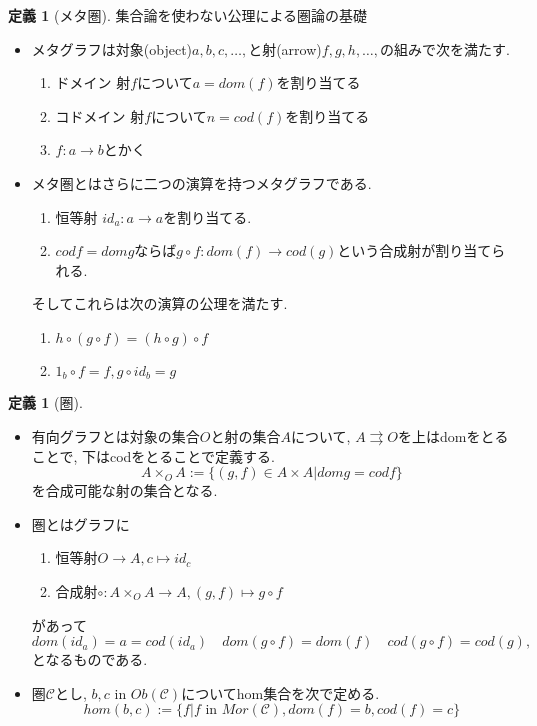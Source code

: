 \documentclass[dvipdfmx,a4paper,11pt]{article}
\theoremstyle{definition}
\newtheorem{dfn}[thm]{定義}
\begin{document}
 \begin{tcolorbox}
 [colback = white, colframe = green!35!black, fonttitle = \bfseries,breakable = true]
\begin{dfn}[メタ圏]
集合論を使わない公理による圏論の基礎
\begin{itemize}
\item メタグラフは対象(object)$a,b,c,\ldots, $と射(arrow)$f,g,h,\ldots, $の組みで次を満たす.
\begin{enumerate}
\item ドメイン 射$f$について$a = dom(f)$を割り当てる
\item コドメイン 射$f$について$n = cod(f)$を割り当てる
\item $f : a \to b$とかく
\end{enumerate}
\item  メタ圏とはさらに二つの演算を持つメタグラフである.
\begin{enumerate}
\item 恒等射 $id_a : a \to a$を割り当てる.
\item $cod f = dom g$ならば$g \circ f : dom(f) \to cod(g)$という合成射が割り当てられる.
\end{enumerate}
そしてこれらは次の演算の公理を満たす.
\begin{enumerate}
\item $h\circ (g \circ f) = (h\circ g) \circ f$
\item $1_{b} \circ f = f, g \circ id_{b} = g$
\end{enumerate}
\end{itemize}
\end{dfn}
\end{tcolorbox}


 \begin{tcolorbox}
 [colback = white, colframe = green!35!black, fonttitle = \bfseries,breakable = true]
\begin{dfn}[圏]
\begin{itemize}
\item 有向グラフとは対象の集合$O$と射の集合$A$について, $A \rightrightarrows O$を上はdomをとることで, 下はcodをとることで定義する.
$$
A \times_{O} A := \{ (g,f) \in A \times A| dom g = cod f
\}
$$
を合成可能な射の集合となる.
\item 圏とはグラフに
\begin{enumerate}
\item 恒等射$O \to A, c \mapsto id_c$
\item 合成射$ \circ : A \times_{O} A \to A, (g,f) \mapsto g \circ f$
\end{enumerate}
があって
$$dom(id_a) = a = cod (id_a) \quad 
dom(g \circ f ) = dom (f) \quad cod (g \circ f ) = cod (g), 
$$
となるものである.
\item 圏$\mathcal{C}$とし, $b,c \text{ in } Ob(\mathcal{C})$についてhom集合を次で定める.
$$
hom(b,c) := \{ f | f \text{ in } Mor(\mathcal{C}), dom (f) = b, cod (f) = c\}
$$
\end{itemize}
\end{dfn}
 \end{tcolorbox}
 
\end{document}
